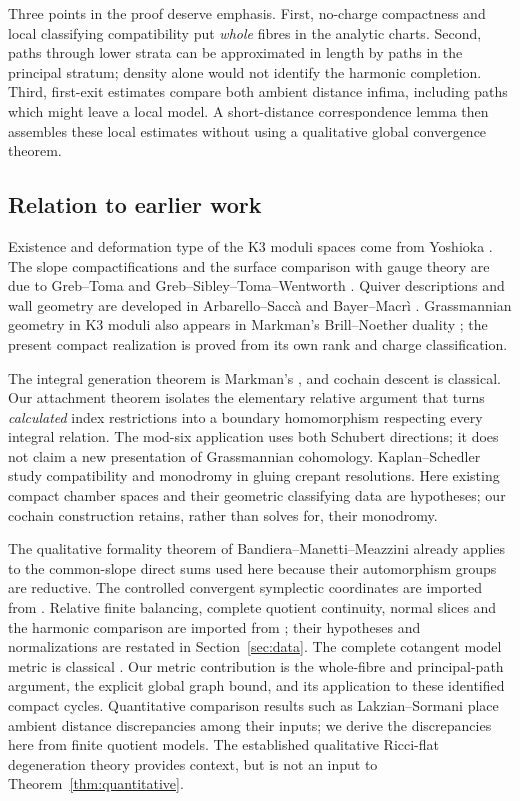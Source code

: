 Three points in the proof deserve emphasis.
First, no-charge compactness and local classifying compatibility
put \emph{whole} fibres in the analytic charts.
Second, paths through lower strata can be approximated in
length by paths in the principal stratum; density alone would
not identify the harmonic completion.
Third, first-exit estimates compare both ambient distance
infima, including paths which might leave a local model.
A short-distance correspondence lemma then assembles these
local estimates without using a qualitative global convergence
theorem.

\subsection{Relation to earlier work}
Existence and deformation type of the K3 moduli spaces come
from Yoshioka \cite{yoshioka99,yoshioka01}.
The slope compactifications and the surface comparison with
gauge theory are due to Greb--Toma and
Greb--Sibley--Toma--Wentworth \cite{grebtoma,gstw}.
Quiver descriptions and wall geometry are developed in
Arbarello--Saccà and Bayer--Macrì
\cite{arbarellosacca,bayermacri}.
Grassmannian geometry in K3 moduli also appears in Markman's
Brill--Noether duality \cite{markmanbn}; the present compact
realization is proved from its own rank and charge classification.

The integral generation theorem is Markman's
\cite{markman}, and cochain descent is classical.
Our attachment theorem isolates the elementary relative
argument that turns \emph{calculated} index restrictions into
a boundary homomorphism respecting every integral relation.
The mod-six application uses both Schubert directions; it
does not claim a new presentation of Grassmannian cohomology.
Kaplan--Schedler \cite{kaplanschedler} study compatibility
and monodromy in gluing crepant resolutions.
Here existing compact chamber spaces and their geometric
classifying data are hypotheses; our cochain construction
retains, rather than solves for, their monodromy.

The qualitative formality theorem of
Bandiera--Manetti--Meazzini \cite{bmm} already applies to the
common-slope direct sums used here because their automorphism
groups are reductive. The controlled convergent symplectic
coordinates are imported from \cite{wuebben17}.
Relative finite balancing, complete quotient continuity,
normal slices and the harmonic comparison are imported from
\cite{wuebben14,wuebben15}; their hypotheses and normalizations
are restated in Section~\ref{sec:data}.
The complete cotangent model metric is classical
\cite{biquardgauduchon}.
Our metric contribution is the whole-fibre and principal-path
argument, the explicit global graph bound, and its application
to these identified compact cycles.
Quantitative comparison results such as
Lakzian--Sormani \cite{lakziansormani,lakziansormanier}
place ambient distance discrepancies among their inputs;
we derive the discrepancies here from finite quotient models.
The established qualitative Ricci-flat degeneration theory
\cite{tosatti,song} provides context, but is not an input to
Theorem~\ref{thm:quantitative}.

